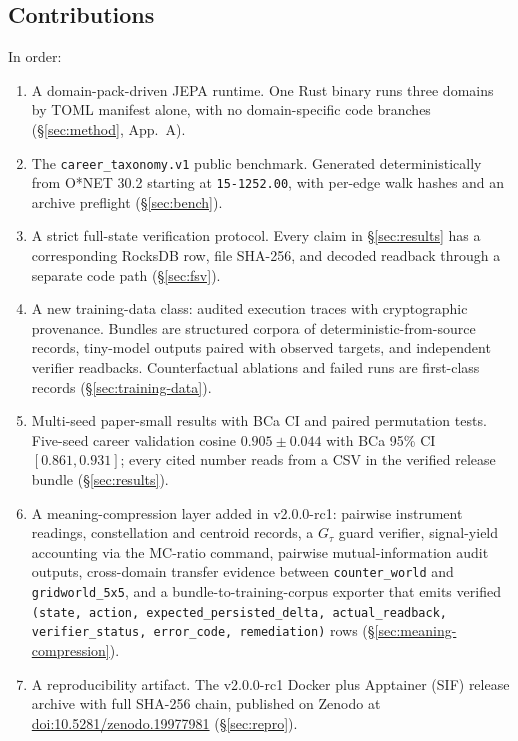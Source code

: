 \documentclass[10pt,twocolumn,letterpaper]{article}
\newcommand{\code}[1]{\texttt{\small #1}}
\begin{document}
\subsection{Contributions}

In order:
\begin{enumerate}
  \item A domain-pack-driven JEPA runtime. One Rust binary runs
        three domains by TOML manifest alone, with no
        domain-specific code branches (\S\ref{sec:method}, App.~A).
  \item The \texttt{career\_taxonomy.v1} public benchmark.
        Generated deterministically from O*NET 30.2 starting at
        \texttt{15-1252.00}, with per-edge walk hashes and an
        archive preflight (\S\ref{sec:bench}).
  \item A strict full-state verification protocol. Every claim in
        \S\ref{sec:results} has a corresponding RocksDB row, file
        SHA-256, and decoded readback through a separate code path
        (\S\ref{sec:fsv}).
  \item A new training-data class: audited execution traces with
        cryptographic provenance. Bundles are structured corpora of
        deterministic-from-source records, tiny-model outputs paired
        with observed targets, and independent verifier readbacks.
        Counterfactual ablations and failed runs are first-class
        records (\S\ref{sec:training-data}).
  \item Multi-seed paper-small results with BCa CI and paired
        permutation tests. Five-seed career validation cosine
        $0.905 \pm 0.044$ with BCa 95\% CI \([0.861, 0.931]\); every
        cited number reads from a CSV in the verified release bundle
        (\S\ref{sec:results}).
  \item A meaning-compression layer added in v2.0.0-rc1: pairwise
        instrument readings, constellation and centroid records, a
        $G_\tau$ guard verifier, signal-yield accounting via the
        MC-ratio command, pairwise mutual-information audit outputs,
        cross-domain transfer evidence between
        \texttt{counter\_world} and \texttt{gridworld\_5x5}, and a
        bundle-to-training-corpus exporter that emits verified
        \code{(state, action, expected\_persisted\_delta,
        actual\_readback, verifier\_status, error\_code,
        remediation)} rows
        (\S\ref{sec:meaning-compression}).
  \item A reproducibility artifact. The v2.0.0-rc1 Docker plus
        Apptainer (SIF) release archive with full SHA-256 chain,
        published on Zenodo at
        \href{https://doi.org/10.5281/zenodo.19977981}{doi:10.5281/zenodo.19977981}
        (\S\ref{sec:repro}).
\end{enumerate}
\end{document}
